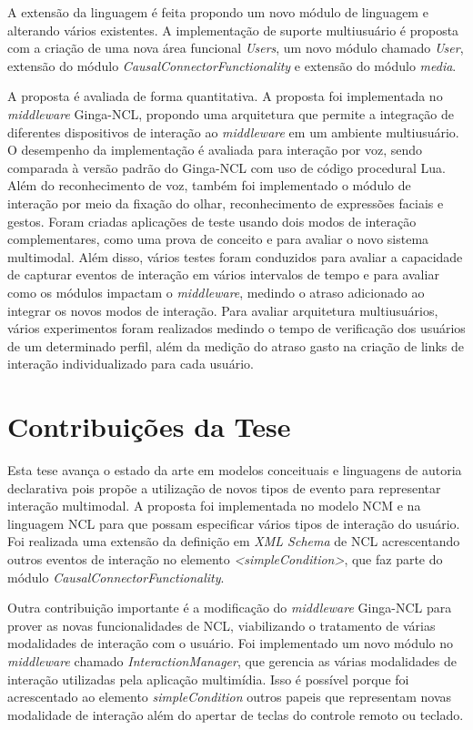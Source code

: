 A extensão da linguagem é feita propondo um novo módulo de linguagem e alterando vários existentes. A implementação de suporte multiusuário é proposta com a criação de uma nova área funcional \textit{Users}, um novo módulo chamado \textit{User}, extensão do módulo \textit{CausalConnectorFunctionality} e extensão do módulo  \textit{media}. 

A proposta é avaliada de forma quantitativa. A proposta foi implementada no \textit{middleware} Ginga-NCL, propondo uma arquitetura que permite a integração de diferentes dispositivos de interação ao \textit{middleware} em um ambiente multiusuário. O desempenho da implementação é avaliada para interação por voz, sendo comparada à versão padrão do Ginga-NCL \cite{abnt-sbtvd} com uso de código procedural Lua. Além do reconhecimento de voz, também foi implementado o módulo de interação por meio da fixação do olhar, reconhecimento de expressões faciais e gestos. Foram criadas aplicações de teste usando dois modos de interação complementares, como uma prova de conceito e para avaliar o novo sistema multimodal. Além disso, vários testes foram conduzidos para avaliar a capacidade de capturar eventos de interação em vários intervalos de tempo e para avaliar como os módulos impactam o \textit{middleware}, medindo o atraso adicionado ao integrar os novos modos de interação. Para avaliar arquitetura multiusuários, vários experimentos foram realizados medindo o tempo de verificação dos usuários de um determinado perfil, além da medição do atraso gasto na criação de links de interação individualizado para cada usuário.


\section{Contribuições da Tese}
\label{sec:contribuicoes}

 

Esta tese avança o estado da arte em modelos conceituais e linguagens de autoria declarativa pois propõe a utilização de novos tipos de evento para representar interação multimodal. A proposta foi implementada no modelo NCM e na linguagem NCL para que possam especificar vários tipos de interação do usuário. Foi realizada uma extensão da definição em \textit{XML Schema} de NCL acrescentando outros eventos de interação no elemento \textit{<simpleCondition>}, que faz parte do módulo \textit{CausalConnectorFunctionality}. 

Outra contribuição importante é a modificação do \textit{middleware} Ginga-NCL para prover as novas funcionalidades de NCL, viabilizando o tratamento de várias modalidades de interação com o usuário. Foi implementado um novo módulo no \textit{middleware} chamado \textit{InteractionManager}, que gerencia as várias modalidades de interação utilizadas pela aplicação multimídia. Isso é possível porque foi acrescentado ao elemento \textit{simpleCondition} outros papeis que representam novas modalidade de interação além do apertar de teclas do controle remoto ou teclado.

